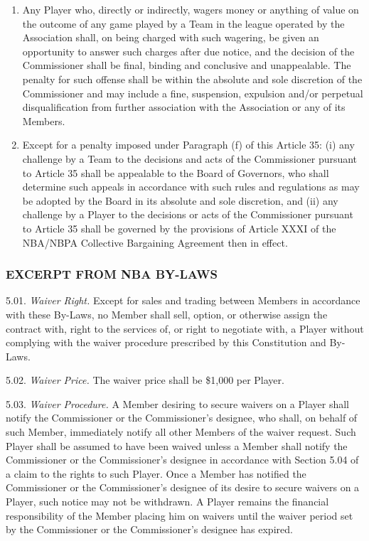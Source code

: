 \documentclass[
]{book}
\begin{document}
\begin{enumerate}
\begin{enumerate}
  \item
    Any Player who, directly or indirectly, wagers money or anything of value on the outcome of any game played by a Team in the league operated by the Association shall, on being charged with such wagering, be given an opportunity to answer such charges after due notice, and the decision of the Commissioner shall be final, binding and conclusive and unappealable. The penalty for such offense shall be within the absolute and sole discretion of the Commissioner and may include a fine, suspension, expulsion and/or perpetual disqualification from further association with the Association or any of its Members.
  \item
    Except for a penalty imposed under Paragraph (f) of this Article 35: (i) any challenge by a Team to the decisions and acts of the Commissioner pursuant to Article 35 shall be appealable to the Board of Governors, who shall determine such appeals in accordance with such rules and regulations as may be adopted by the Board in its absolute and sole discretion, and (ii) any challenge by a Player to the decisions or acts of the Commissioner pursuant to Article 35 shall be governed by the provisions of Article XXXI of the NBA/NBPA Collective Bargaining Agreement then in effect.
  \end{enumerate}
\end{enumerate}

\newpage

\hypertarget{excerpt-from-nba-by-laws}{%
\subsubsection{EXCERPT FROM NBA BY-LAWS}\label{excerpt-from-nba-by-laws}}

5.01. \emph{Waiver Right.} Except for sales and trading between Members in accordance with these By-Laws, no Member shall sell, option, or otherwise assign the contract with, right to the services of, or right to negotiate with, a Player without complying with the waiver procedure prescribed by this Constitution and By-Laws.

5.02. \emph{Waiver Price.} The waiver price shall be \$1,000 per Player.

5.03. \emph{Waiver Procedure.} A Member desiring to secure waivers on a Player shall notify the Commissioner or the Commissioner's designee, who shall, on behalf of such Member, immediately notify all other Members of the waiver request. Such Player shall be assumed to have been waived unless a Member shall notify the Commissioner or the Commissioner's designee in accordance with Section 5.04 of a claim to the rights to such Player. Once a Member has notified the Commissioner or the Commissioner's designee of its desire to secure waivers on a Player, such notice may not be withdrawn. A Player remains the financial responsibility of the Member placing him on waivers until the waiver period set by the Commissioner or the Commissioner's designee has expired.
\end{document}
